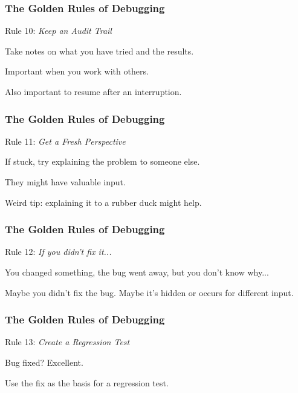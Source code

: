 \begin{frame}
\frametitle{The Golden Rules of Debugging}
\begin{changemargin}{1cm}

Rule 10: \emph{Keep an Audit Trail}

Take notes on what you have tried and the results.

Important when you work with others.

Also important to resume after an interruption.

\end{changemargin}
\end{frame}

\begin{frame}
\frametitle{The Golden Rules of Debugging}
\begin{changemargin}{1cm}

Rule 11: \emph{Get a Fresh Perspective}

If stuck, try explaining the problem to someone else.

They might have valuable input. 

Weird tip: explaining it to a rubber duck might help. 

\end{changemargin}
\end{frame}

\begin{frame}
\frametitle{The Golden Rules of Debugging}
\begin{changemargin}{1cm}

Rule 12: \emph{If you didn't fix it...}

You changed something, the bug went away, but you don't know why...

Maybe you didn't fix the bug. Maybe it's hidden or occurs for different input.

\end{changemargin}
\end{frame}

\begin{frame}
\frametitle{The Golden Rules of Debugging}
\begin{changemargin}{1cm}

Rule 13: \emph{Create a Regression Test}

Bug fixed? Excellent.

Use the fix as the basis for a regression test.

\end{changemargin}
\end{frame}



